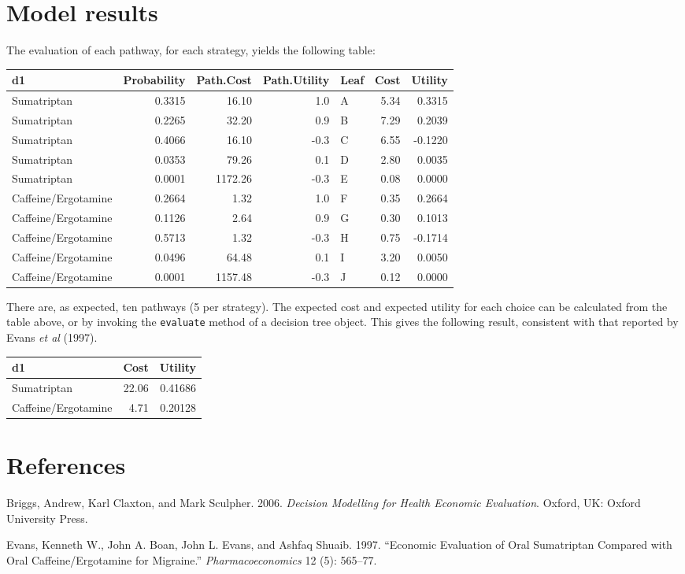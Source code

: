 \documentclass[
]{article}
\begin{document}
\hypertarget{model-results}{%
\section{Model results}\label{model-results}}

The evaluation of each pathway, for each strategy, yields the following
table:

\begin{longtable}[]{@{}lrrrlrr@{}}
\toprule
d1 & Probability & Path.Cost & Path.Utility & Leaf & Cost &
Utility\tabularnewline
\midrule
\endhead
Sumatriptan & 0.3315 & 16.10 & 1.0 & A & 5.34 & 0.3315\tabularnewline
Sumatriptan & 0.2265 & 32.20 & 0.9 & B & 7.29 & 0.2039\tabularnewline
Sumatriptan & 0.4066 & 16.10 & -0.3 & C & 6.55 & -0.1220\tabularnewline
Sumatriptan & 0.0353 & 79.26 & 0.1 & D & 2.80 & 0.0035\tabularnewline
Sumatriptan & 0.0001 & 1172.26 & -0.3 & E & 0.08 & 0.0000\tabularnewline
Caffeine/Ergotamine & 0.2664 & 1.32 & 1.0 & F & 0.35 &
0.2664\tabularnewline
Caffeine/Ergotamine & 0.1126 & 2.64 & 0.9 & G & 0.30 &
0.1013\tabularnewline
Caffeine/Ergotamine & 0.5713 & 1.32 & -0.3 & H & 0.75 &
-0.1714\tabularnewline
Caffeine/Ergotamine & 0.0496 & 64.48 & 0.1 & I & 3.20 &
0.0050\tabularnewline
Caffeine/Ergotamine & 0.0001 & 1157.48 & -0.3 & J & 0.12 &
0.0000\tabularnewline
\bottomrule
\end{longtable}

There are, as expected, ten pathways (5 per strategy). The expected cost
and expected utility for each choice can be calculated from the table
above, or by invoking the \texttt{evaluate} method of a decision tree
object. This gives the following result, consistent with that reported
by Evans \emph{et al} (1997).

\begin{longtable}[]{@{}lrr@{}}
\toprule
d1 & Cost & Utility\tabularnewline
\midrule
\endhead
Sumatriptan & 22.06 & 0.41686\tabularnewline
Caffeine/Ergotamine & 4.71 & 0.20128\tabularnewline
\bottomrule
\end{longtable}

\hypertarget{references}{%
\section*{References}\label{references}}

\hypertarget{refs}{}
\leavevmode\hypertarget{ref-briggs:2002a}{}%
Briggs, Andrew, Karl Claxton, and Mark Sculpher. 2006. \emph{Decision
Modelling for Health Economic Evaluation}. Oxford, UK: Oxford University
Press.

\leavevmode\hypertarget{ref-evans:1997a}{}%
Evans, Kenneth W., John A. Boan, John L. Evans, and Ashfaq Shuaib. 1997.
``Economic Evaluation of Oral Sumatriptan Compared with Oral
Caffeine/Ergotamine for Migraine.'' \emph{Pharmacoeconomics} 12 (5):
565--77.
\end{document}
